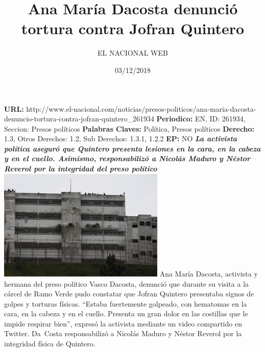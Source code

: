 \documentclass{article}%
\title{\textbf{Ana María Dacosta denunció tortura contra Jofran Quintero}}%
\author{EL NACIONAL WEB}%
\date{03/12/2018}%
\begin{document}
%
\normalsize%
\maketitle%
\textbf{URL: }%
http://www.el{-}nacional.com/noticias/presos{-}politicos/ana{-}maria{-}dacosta{-}denuncio{-}tortura{-}contra{-}jofran{-}quintero\_261934\newline%
%
\textbf{Periodico: }%
EN, %
ID: %
261934, %
Seccion: %
Presos políticos\newline%
%
\textbf{Palabras Claves: }%
Política, Presos políticos\newline%
%
\textbf{Derecho: }%
1.3, %
Otros Derechos: %
1.2, %
Sub Derechos: %
1.3.1, 1.2.2\newline%
%
\textbf{EP: }%
NO\newline%
\newline%
%
\textbf{\textit{La activista política aseguró que Quintero presenta lesiones en la cara, en la cabeza y en el cuello. Asimismo, responsabilizó a Nicolás Maduro y Néstor Reverol por la integridad del preso político}}%
\newline%
\newline%
%
\includegraphics[width=300px]{14.jpg}%
\newline%
%
Ana María Dacosta, activista y hermana del preso político Vasco Dacosta, denunció que durante su visita a la cárcel de Ramo Verde pudo constatar que Jofran Quintero presentaba signos de golpes y torturas físicas.%
\newline%
%
“Estaba fuertemente golpeado, con hematomas en la cara, en la cabeza y en el cuello. Presenta un gran dolor en las costillas que le impide respirar bien”, expresó la activista mediante un video compartido en Twitter.%
\newline%
%
Da~Costa responsabilizó a Nicolás Maduro y Néstor Reverol por la integridad física de Quintero.%
\newline%
%
\end{document}
